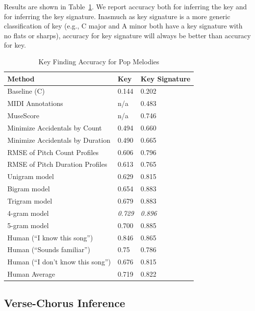 \documentclass[letterpaper]{article}
\begin{document}
Results are shown in Table~\ref{tab:results}. We report accuracy both for inferring the key and for inferring the key signature. Inasmuch as key signature is a more generic classification of key (e.g., C major and A minor both have a key signature with no flats or sharps), accuracy for key signature will always be better than accuracy for key.
\begin{table}[]
\centering
\caption{Key Finding Accuracy for Pop Melodies}
\label{tab:results}
\begin{tabular}{@{}lll@{}}
\toprule
Method & Key & Key Signature \\ \midrule
Baseline (C)	&	0.144 	&	0.202 \\
MIDI	Annotations		&	n/a		&	0.483 \\
MuseScore	&	n/a		&	0.746 \\ \midrule
Minimize Accidentals	 by Count	&	0.494 &		0.660 \\
Minimize Accidentals	 by Duration	&	0.490 &		0.665 \\
RMSE of Pitch Count Profiles	&	0.606	&	0.796	\\
RMSE of Pitch Duration Profiles	&	0.613	&	0.765	\\ \midrule
Unigram model    	&	0.629	& 0.815       \\
Bigram model		&	0.654	&	0.883	\\
Trigram model		&	0.679	&	0.883	\\
4-gram model		&	\emph{0.729} &	\emph{0.896}	\\
5-gram model		&	0.700 &	0.885              \\ \bottomrule
Human (``I know this song'')		&	0.846	&	0.865	\\
Human (``Sounds familiar'') 		&	0.75 &	0.786	\\
Human (``I don't know this song'')		&	0.676 &	0.815              \\ \midrule
Human Average		&	0.719 &	0.822              \\ \bottomrule
\end{tabular}
\end{table}


\subsection{Verse-Chorus Inference}

\end{document}
